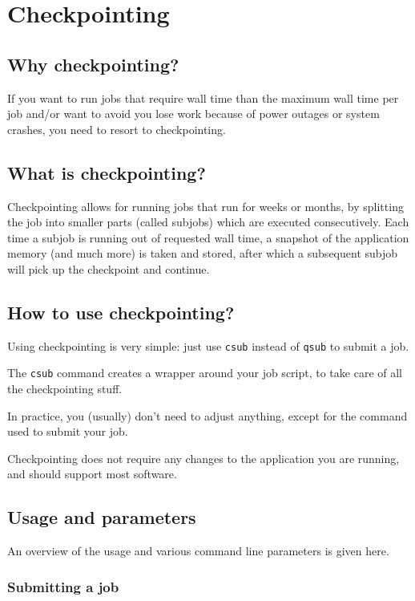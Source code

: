 \chapter{Checkpointing}
\label{ch:checkpointing}
\section{Why checkpointing?}
If you want to run jobs that require wall time than the maximum wall time per job
and/or want to avoid you lose work because of power outages or system crashes,
you need to resort to checkpointing.

\section{What is checkpointing?}

Checkpointing allows for running jobs that run for weeks or months, by splitting
the job into smaller parts (called subjobs) which are executed consecutively.
Each time a subjob is running out of requested wall time, a snapshot of the
application memory (and much more) is taken and stored, after which a subsequent
subjob will pick up the checkpoint and continue.

\section{How to use checkpointing?}

Using checkpointing is very simple: just use \lstinline|csub| instead of \lstinline|qsub| to submit a job.

The \lstinline|csub| command creates a wrapper around your job script, to take care
of all the checkpointing stuff.

In practice, you (usually) don't need to adjust anything, except for the command used to submit your job.

Checkpointing does not require any changes to the application you are running, and should support most software.

\section{Usage and parameters}

An overview of the usage and various command line parameters is given here.

\subsection{Submitting a job}

